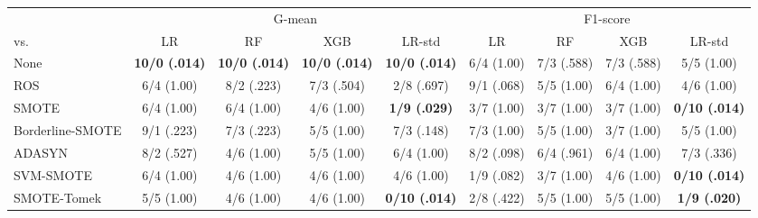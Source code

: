 \begin{tabular}{@{}lcccccccc@{}}
\toprule
 & \multicolumn{4}{c}{G-mean} & \multicolumn{4}{c}{F1-score} \\
\cmidrule(lr){2-5}\cmidrule(lr){6-9}
vs.\ & LR & RF & XGB & LR-std & LR & RF & XGB & LR-std \\
\midrule
None & \textbf{10/0 (.014)} & \textbf{10/0 (.014)} & \textbf{10/0 (.014)} & \textbf{10/0 (.014)} & 6/4 (1.00) & 7/3 (.588) & 7/3 (.588) & 5/5 (1.00) \\
ROS & 6/4 (1.00) & 8/2 (.223) & 7/3 (.504) & 2/8 (.697) & 9/1 (.068) & 5/5 (1.00) & 6/4 (1.00) & 4/6 (1.00) \\
SMOTE & 6/4 (1.00) & 6/4 (1.00) & 4/6 (1.00) & \textbf{1/9 (.029)} & 3/7 (1.00) & 3/7 (1.00) & 3/7 (1.00) & \textbf{0/10 (.014)} \\
Borderline-SMOTE & 9/1 (.223) & 7/3 (.223) & 5/5 (1.00) & 7/3 (.148) & 7/3 (1.00) & 5/5 (1.00) & 3/7 (1.00) & 5/5 (1.00) \\
ADASYN & 8/2 (.527) & 4/6 (1.00) & 5/5 (1.00) & 6/4 (1.00) & 8/2 (.098) & 6/4 (.961) & 6/4 (1.00) & 7/3 (.336) \\
SVM-SMOTE & 6/4 (1.00) & 4/6 (1.00) & 4/6 (1.00) & 4/6 (1.00) & 1/9 (.082) & 3/7 (1.00) & 4/6 (1.00) & \textbf{0/10 (.014)} \\
SMOTE-Tomek & 5/5 (1.00) & 4/6 (1.00) & 4/6 (1.00) & \textbf{0/10 (.014)} & 2/8 (.422) & 5/5 (1.00) & 5/5 (1.00) & \textbf{1/9 (.020)} \\
\bottomrule
\end{tabular}